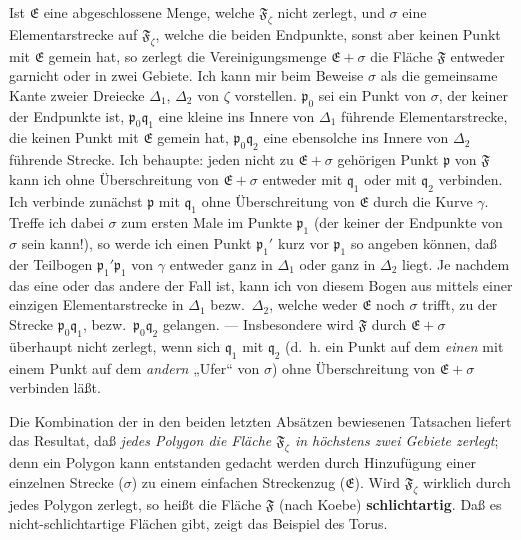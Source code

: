 \documentclass{article}
\begin{document}
Ist $\mathfrak{E}$ eine abgeschlossene Menge, welche $\mathfrak{F}_\zeta$ nicht zerlegt, und $\sigma$ eine Elementarstrecke auf $\mathfrak{F}_\zeta$, welche die beiden Endpunkte, sonst aber keinen Punkt mit $\mathfrak{E}$ gemein hat, so zerlegt die Vereinigungsmenge $\mathfrak{E} + \sigma$ die Fläche $\mathfrak{F}$ entweder garnicht oder in zwei Gebiete. Ich kann mir beim Beweise $\sigma$ als die gemeinsame Kante zweier Dreiecke $\Delta_1$, $\Delta_2$ von $\zeta$ vorstellen. $\mathfrak{p}_0$ sei ein Punkt von $\sigma$, der keiner der Endpunkte ist, $\mathfrak{p}_0\mathfrak{q}_1$ eine kleine ins Innere von $\Delta_1$ führende Elementarstrecke, die keinen Punkt mit $\mathfrak{E}$ gemein hat, $\mathfrak{p}_0\mathfrak{q}_2$ eine ebensolche ins Innere von $\Delta_2$ führende Strecke. Ich behaupte: jeden nicht zu $\mathfrak{E} + \sigma$ gehörigen Punkt $\mathfrak{p}$ von $\mathfrak{F}$ kann ich ohne Überschreitung von $\mathfrak{E} + \sigma$ entweder mit $\mathfrak{q}_1$ oder mit $\mathfrak{q}_2$ verbinden. Ich verbinde zunächst $\mathfrak{p}$ mit $\mathfrak{q}_1$ ohne Überschreitung von $\mathfrak{E}$ durch die Kurve $\gamma$. Treffe ich dabei $\sigma$ zum ersten Male im Punkte $\mathfrak{p}_1$ (der keiner der Endpunkte von $\sigma$ sein kann!), so werde ich einen Punkt $\mathfrak{p}_1'$ kurz vor $\mathfrak{p}_1$ so angeben können, daß der Teilbogen $\mathfrak{p}_1'\mathfrak{p}_1$ von $\gamma$ entweder ganz in $\Delta_1$ oder ganz in $\Delta_2$ liegt. Je nachdem das eine oder das andere der Fall ist, kann ich von diesem Bogen aus mittels einer einzigen Elementarstrecke in $\Delta_1$ bezw.\ $\Delta_2$, welche weder $\mathfrak{E}$ noch $\sigma$ trifft, zu der Strecke $\mathfrak{p}_0\mathfrak{q}_1$, bezw.\ $\mathfrak{p}_0\mathfrak{q}_2$ gelangen. --- Insbesondere wird $\mathfrak{F}$ durch $\mathfrak{E} + \sigma$ überhaupt nicht zerlegt, wenn sich $\mathfrak{q}_1$ mit $\mathfrak{q}_2$ (d.~h. ein Punkt auf dem \emph{einen} mit einem Punkt auf dem \emph{andern} „Ufer“ von $\sigma$) ohne Überschreitung von $\mathfrak{E} + \sigma$ verbinden läßt.

Die Kombination der in den beiden letzten Absätzen bewiesenen Tatsachen liefert das Resultat, daß \emph{jedes Polygon die Fläche $\mathfrak{F}_\zeta$ in höchstens zwei Gebiete zerlegt}; denn ein Polygon kann entstanden gedacht werden durch Hinzufügung einer einzelnen Strecke ($\sigma$) zu einem einfachen Streckenzug ($\mathfrak{E}$). Wird $\mathfrak{F}_\zeta$ wirklich durch jedes Polygon zerlegt, so heißt die Fläche $\mathfrak{F}$ (nach Koebe) \textbf{schlichtartig}. Daß es nicht-schlichtartige Flächen gibt, zeigt das Beispiel des Torus.
\end{document}
